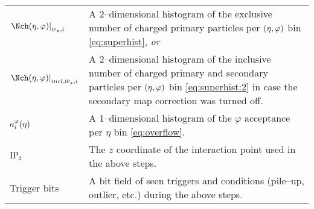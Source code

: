\begin{tabular}[T]{p{.2\linewidth}p{.76\linewidth}}
  $\dndetadphi[\subIPz,i]$ & A 2--dimensional histogram of the
                             exclusive number of charged primary
                             particles per $(\eta,\varphi)$ bin
                             \eqref{eq:superhist}, \emph{or}\\ 
  $\dndetadphi[incl,\subIPz,i]$ & A 2--dimensional histogram of the
                                  inclusive number of charged primary
                                  and secondary particles per
                                  $(\eta,\varphi)$ bin \eqref{eq:superhist:2}
                                  in case the secondary map correction
                                  was turned off.\\   
  $a_i^{\varphi}(\eta){}$ & A 1--dimensional histogram of the $\varphi$ acceptance
                per $\eta$ bin \eqref{eq:overflow}. \\
  $\IPz$ & The $z$ coordinate of the interaction point used in the
           above steps.\\
  Trigger bits & A bit field of seen triggers and conditions
                 (pile--up, \SPD{} outlier, etc.) during the above steps.\\ 
\end{tabular}


